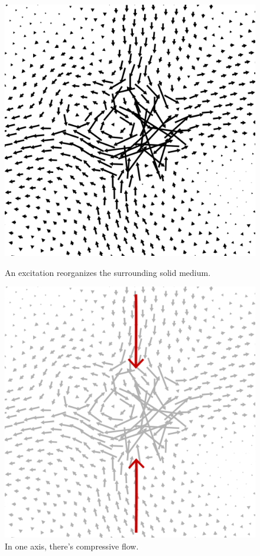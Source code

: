 \begin{frame}[c]
\begin{columns}[T]
\begin{column}[T]{0.4\textwidth}
\begin{figure}[t]
\begin{overprint}
\centering\includegraphics[width=0.85\linewidth]{b.1-exc_pureshear/zoomin-0.pdf}\caption{An excitation reorganizes the surrounding solid medium.}

\centering\includegraphics[width=0.85\linewidth]{b.1-exc_pureshear/zoomin-1.pdf}\caption{In one axis, there's compressive flow.}


\end{overprint}
\end{figure}
\end{column}
\end{columns}
\end{frame}
